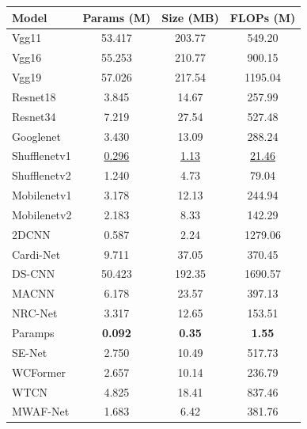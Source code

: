 \begin{minipage}[t]{0.48\linewidth}\vspace{0pt}\centering
\captionsetup{type=table}
\centering\color{black}
\caption{Parameters, storage, and FLOPs per 1.5-s segment. Lower costs are preferable.}\label{tab:supp_resource}
\begingroup
\fontsize{8.5}{10.2}\selectfont
\setlength{\tabcolsep}{1.3pt}\renewcommand{\arraystretch}{1.01}
\begin{tabular*}{\linewidth}{@{\extracolsep{\fill}}lccc@{}}\toprule
\textbf{Model} & \textbf{Params (M)} & \textbf{Size (MB)} & \textbf{FLOPs (M)}\\\midrule
Vgg11 & 53.417 & 203.77 & 549.20\\
Vgg16 & 55.253 & 210.77 & 900.15\\
Vgg19 & 57.026 & 217.54 & 1195.04\\
Resnet18 & 3.845 & 14.67 & 257.99\\
Resnet34 & 7.219 & 27.54 & 527.48\\
Googlenet & 3.430 & 13.09 & 288.24\\
\midrule
Shufflenetv1 & \underline{0.296} & \underline{1.13} & \underline{21.46}\\
Shufflenetv2 & 1.240 & 4.73 & 79.04\\
Mobilenetv1 & 3.178 & 12.13 & 244.94\\
Mobilenetv2 & 2.183 & 8.33 & 142.29\\
\midrule
2DCNN~\cite{2DCNN} & 0.587 & 2.24 & 1279.06\\
Cardi-Net~\cite{Cardi-Net} & 9.711 & 37.05 & 370.45\\
DS-CNN~\cite{DS-CNN} & 50.423 & 192.35 & 1690.57\\
MACNN~\cite{chen2021multi} & 6.178 & 23.57 & 397.13\\
NRC-Net~\cite{NRC-Net} & 3.317 & 12.65 & 153.51\\
Paramps~\cite{Paramps} & \textbf{0.092} & \textbf{0.35} & \textbf{1.55}\\
SE-Net~\cite{SE-Net} & 2.750 & 10.49 & 517.73\\
WCFormer~\cite{WCFormer} & 2.657 & 10.14 & 236.79\\
\midrule
WTCN & 4.825 & 18.41 & 837.46\\
MWAF-Net & 1.683 & 6.42 & 381.76\\
\bottomrule\end{tabular*}
\endgroup
{}
\end{minipage}

